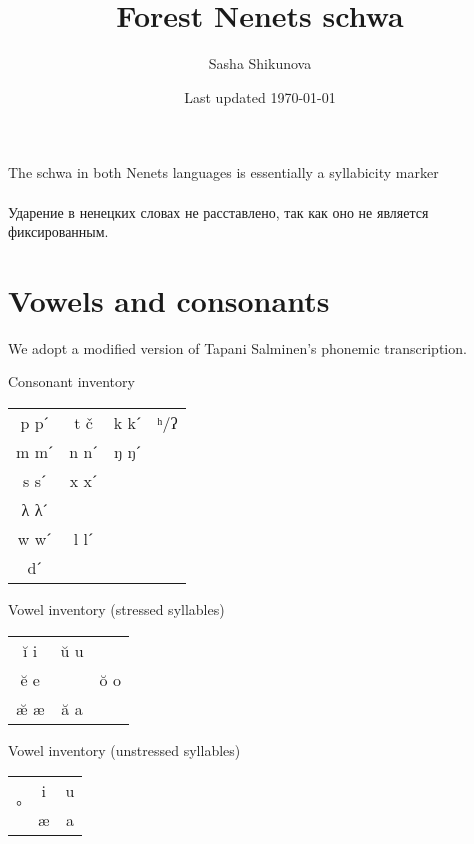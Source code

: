 \documentclass[a4paper, 12pt]{article}
\title{Forest Nenets schwa}
\author{Sasha Shikunova}
\date{Last updated \today}
\begin{document}
\maketitle

\begin{flushright} 
The schwa in both Nenets languages is essentially a syllabicity marker\\\parencite[p. 358]{salminen2007}\\

\noindent Ударение в ненецких словах не расставлено, так как оно не является фиксированным. \\\parencite[p. 8]{barmich-vello}
\end{flushright}

		\section{Vowels and consonants}
		
	We adopt a modified version of Tapani Salminen's phonemic transcription.\\

\begin{minipage}{.45\textwidth}
\noindent Consonant inventory
\begin{table}[H]
\begin{tabular}{cccc}
p pˊ & t č  & k kˊ & ʰ/ʔ \\
m mˊ & n nˊ & ŋ ŋˊ &     \\
s sˊ & x xˊ &      &     \\
λ λˊ &      &      &     \\
w wˊ & l lˊ &      &     \\
dˊ   &      &      &    
\end{tabular}
\end{table}
\end{minipage}
\vspace*{1em}
\hfill
\begin{minipage}{.45\textwidth}
Vowel inventory (stressed syllables)

\begin{table}[H]
\begin{tabular}{ccc}
ĭ i  & ŭ u &     \\
ĕ e  &    & ŏ o \\
æ̆ æ & ă a &    
\end{tabular}
\end{table}
\end{minipage}
\begin{center}
\begin{minipage}{.5\textwidth}
Vowel inventory (unstressed syllables)

\begin{table}[H]
\begin{tabular}{ccc}
\multirow{2}{*}{°} & i & u \\
                   & æ & a
\end{tabular}
\end{table}
\end{minipage}
\end{center}
		
\end{document}
